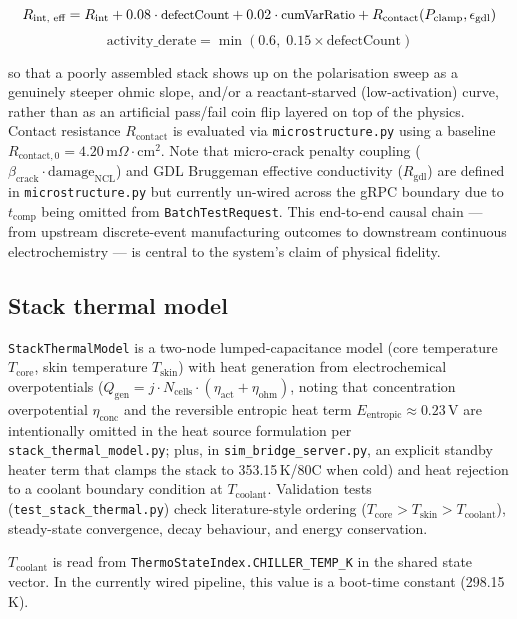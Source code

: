 \documentclass[twocolumn,10pt,a4paper]{article}
\newcommand{\code}[1]{\texttt{\small #1}}
\newcommand{\file}[1]{\texttt{#1}}
\begin{document}
\begin{equation*}
{\small R_{\text{int, eff}} = R_{\text{int}} + 0.08 \cdot \text{defectCount} + 0.02 \cdot \text{cumVarRatio} + R_{\text{contact}}(P_{\text{clamp}}, \epsilon_{\text{gdl}})}
\end{equation*}
\[
\text{activity\_derate} = \min(0.6,\; 0.15 \times \text{defectCount})
\]

so that a poorly assembled stack shows up on the polarisation sweep as a genuinely steeper ohmic slope, and/or a reactant-starved (low-activation) curve, rather than as an artificial pass/fail coin flip layered on top of the physics. Contact resistance $R_{\text{contact}}$ is evaluated via \file{microstructure.py} using a baseline $R_{\text{contact},0} = 4.20\,\text{m}\Omega\cdot\text{cm}^2$. Note that micro-crack penalty coupling ($\beta_{\text{crack}} \cdot \text{damage}_{\text{NCL}}$) and GDL Bruggeman effective conductivity ($R_{\text{gdl}}$) are defined in \file{microstructure.py} but currently un-wired across the gRPC boundary due to $t_{\text{comp}}$ being omitted from \code{BatchTestRequest}. This end-to-end causal chain --- from upstream discrete-event manufacturing outcomes to downstream continuous electrochemistry --- is central to the system's claim of physical fidelity.

\subsection{Stack thermal model}
\code{StackThermalModel} is a two-node lumped-capacitance model (core temperature $T_{\text{core}}$, skin temperature $T_{\text{skin}}$) with heat generation from electrochemical overpotentials ($Q_{\text{gen}} = j \cdot N_{\text{cells}} \cdot (\eta_{\text{act}} + \eta_{\text{ohm}})$, noting that concentration overpotential $\eta_{\text{conc}}$ and the reversible entropic heat term $E_{\text{entropic}} \approx 0.23\,\text{V}$ are intentionally omitted in the heat source formulation per \file{stack\_thermal\_model.py}; plus, in \file{sim\_bridge\_server.py}, an explicit standby heater term that clamps the stack to 353.15\,K/80\textdegree C when cold) and heat rejection to a coolant boundary condition at $T_{\text{coolant}}$. Validation tests (\file{test\_stack\_thermal.py}) check literature-style ordering ($T_{\text{core}} > T_{\text{skin}} > T_{\text{coolant}}$), steady-state convergence, decay behaviour, and energy conservation.


\begin{notebox}
$T_{\text{coolant}}$ is read from \code{ThermoStateIndex.CHILLER\_TEMP\_K} in the shared state vector. In the currently wired pipeline, this value is a boot-time constant (298.15\,K). 
\end{notebox}
\end{document}
